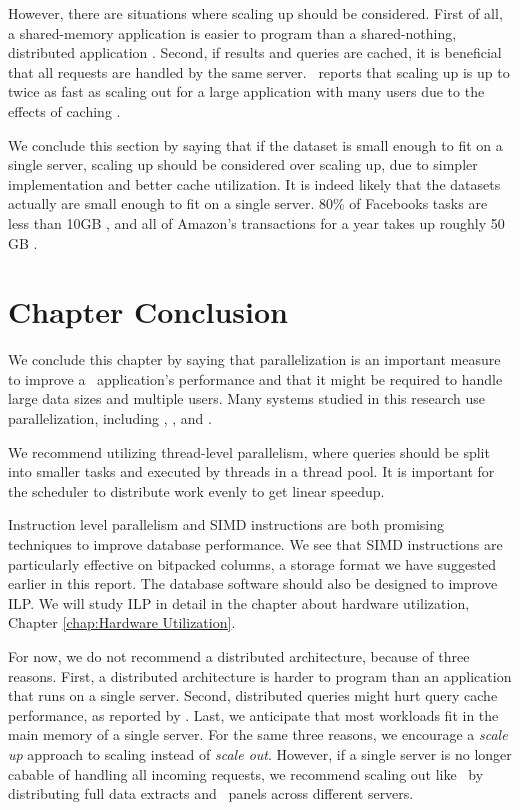 However, there are situations where scaling up should be considered. First of all, a shared-memory application is easier to program than a shared-nothing, distributed application \cite{Boncz2002-yj}. Second, if results and queries are cached, it is beneficial that all requests are handled by the same server. \qlikview~reports that scaling up is up to twice as fast as scaling out for a large application with many users due to the effects of caching \cite{Qlik2012-ku}.

We conclude this section by saying that if the dataset is small enough to fit on a single server, scaling up should be considered over scaling up, due to simpler implementation and better cache utilization. It is indeed likely that the datasets actually are small enough to fit on a single server. 80\% of Facebooks tasks are less than 10GB \cite{Mukherjee2015-ul}, and all of Amazon's transactions for a year takes up roughly 50 GB \cite{Kemper2011-ap}.

\section{Chapter Conclusion}
\label{sec:Chapter Conclusion}
We conclude this chapter by saying that parallelization is an important measure to improve a \bd~application's performance and that it might be required to handle large data sizes and multiple users. Many systems studied in this research use parallelization, including \exasol, \tableau, and \qlikview.

We recommend utilizing thread-level parallelism, where queries should be split into smaller tasks and executed by threads in a thread pool. It is important for the scheduler to distribute work evenly to get linear speedup.

Instruction level parallelism and SIMD instructions are both promising techniques to improve database performance. We see that SIMD instructions are particularly effective on bitpacked columns, a storage format we have suggested earlier in this report. The database software should also be designed to improve ILP. We will study ILP in detail in the chapter about hardware utilization, Chapter \ref{chap:Hardware Utilization}.

For now, we do not recommend a distributed architecture, because of three reasons. First, a distributed architecture is harder to program than an application that runs on a single server. Second, distributed queries might hurt query cache performance, as reported by \qlikview. Last, we anticipate that most workloads fit in the main memory of a single server. For the same three reasons, we encourage a \textit{scale up} approach to scaling instead of \textit{scale out}. However, if a single server is no longer cabable of handling all incoming requests, we recommend scaling out like \qlikview~by distributing full data extracts and \bd~panels across different servers.
